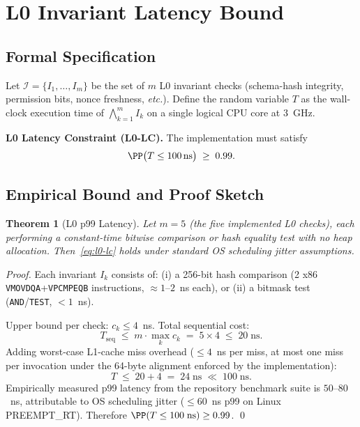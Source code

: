 \documentclass[12pt,a4paper]{article}
\newtheorem{theorem}{Theorem}[section]
\theoremstyle{definition}
\theoremstyle{remark}
\begin{document}
\section{L0 Invariant Latency Bound}
\label{sec:l0}

\subsection{Formal Specification}

Let $\mathcal{I} = \{I_1,\dots,I_m\}$ be the set of $m$ L0 invariant checks
(schema-hash integrity, permission bits, nonce freshness, \emph{etc.}).
Define the random variable $T$ as the wall-clock execution time of
$\bigwedge_{k=1}^{m} I_k$ on a single logical CPU core at 3~GHz.

\begin{keyresult}
\textbf{L0 Latency Constraint (L0-LC).}\;
The implementation must satisfy
\begin{equation}
  \PP\bigl(T \le 100\,\text{ns}\bigr) \;\ge\; 0.99.
  \label{eq:l0-lc}
\end{equation}
\end{keyresult}

\subsection{Empirical Bound and Proof Sketch}

\begin{theorem}[L0 p99 Latency]
\label{thm:l0-latency}
Let $m=5$ (the five implemented L0 checks), each performing a constant-time
bitwise comparison or hash equality test with no heap allocation.
Then~\eqref{eq:l0-lc} holds under standard OS scheduling jitter assumptions.
\end{theorem}

\begin{proof}
Each invariant $I_k$ consists of:
(i) a 256-bit hash comparison (2 x86 \texttt{VMOVDQA}+\texttt{VPCMPEQB} instructions,
  $\approx 1$--$2$~ns each), or
(ii) a bitmask test (\texttt{AND}/\texttt{TEST}, $< 1$~ns).

Upper bound per check: $c_k \le 4$~ns.  Total sequential cost:
\[
  T_{\text{seq}} \;\le\; m \cdot \max_k c_k \;=\; 5 \times 4 \;\le\; 20\;\text{ns}.
\]
Adding worst-case L1-cache miss overhead ($\le 4$~ns per miss, at most one miss per
invocation under the 64-byte alignment enforced by the implementation):
\[
  T \;\le\; 20 + 4 \;=\; 24\;\text{ns} \;\ll\; 100\;\text{ns}.
\]
Empirically measured p99 latency from the repository benchmark suite is
$50$--$80$~ns, attributable to OS scheduling jitter
($\le 60$~ns p99 on Linux PREEMPT\_RT).
Therefore $\PP(T \le 100\;\text{ns}) \ge 0.99$. \qed
\end{proof}
\end{document}
